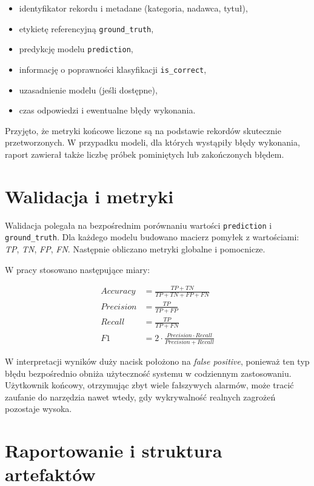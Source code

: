 \documentclass[12pt,a4paper,openright]{report}
\begin{document}
\begin{itemize}
    \item identyfikator rekordu i metadane (kategoria, nadawca, tytuł),
    \item etykietę referencyjną \texttt{ground\_truth},
    \item predykcję modelu \texttt{prediction},
    \item informację o poprawności klasyfikacji \texttt{is\_correct},
    \item uzasadnienie modelu (jeśli dostępne),
    \item czas odpowiedzi i ewentualne błędy wykonania.
\end{itemize}

Przyjęto, że metryki końcowe liczone są na podstawie rekordów skutecznie przetworzonych. W przypadku modeli, dla których wystąpiły błędy wykonania, raport zawierał także liczbę próbek pominiętych lub zakończonych błędem.

\section{Walidacja i metryki}

Walidacja polegała na bezpośrednim porównaniu wartości \texttt{prediction} i \texttt{ground\_truth}. Dla każdego modelu budowano macierz pomyłek z wartościami: \textit{TP}, \textit{TN}, \textit{FP}, \textit{FN}. Następnie obliczano metryki globalne i pomocnicze.

W pracy stosowano następujące miary:

\begin{align*}
Accuracy &= \frac{TP + TN}{TP + TN + FP + FN} \\
Precision &= \frac{TP}{TP + FP} \\
Recall &= \frac{TP}{TP + FN} \\
F1 &= 2 \cdot \frac{Precision \cdot Recall}{Precision + Recall}
\end{align*}

W interpretacji wyników duży nacisk położono na \textit{false positive}, ponieważ ten typ błędu bezpośrednio obniża użyteczność systemu w codziennym zastosowaniu. Użytkownik końcowy, otrzymując zbyt wiele fałszywych alarmów, może tracić zaufanie do narzędzia nawet wtedy, gdy wykrywalność realnych zagrożeń pozostaje wysoka.

\section{Raportowanie i struktura artefaktów}
\end{document}
